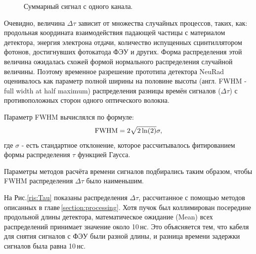 \begin{figure}[h]
	\caption{Суммарный сигнал с одного канала.}
	\label{ris:integralform}
\end{figure}

Очевидно, величина $\Delta\tau$ зависит от множества случайных процессов, таких, как: продольная координата взаимодействия падающей частицы с материалом детектора, энергия электрона отдачи, количество испущенных сцинтиллятором фотонов, достигнувших фотокатода ФЭУ и других. Форма распределения этой величина ожидалась схожей формой нормального распределения случайной величины. Поэтому временное разрешение прототипа детектора NeuRad оценивалось как параметр полной ширины на половине высоты (англ. FWHM - full width at half maximum) распределения разницы времён сигналов ($\Delta\tau$) с противоположных сторон одного оптического волокна.

Параметр FWHM вычислялся по формуле:
\begin{equation}
\label{FWHM}
{\rm FWHM}=2\sqrt{2\ln(2)}\sigma,
\end{equation}
где $\sigma$ - есть стандартное отклонение, которое рассчитывалось фитированием формы распределения $\tau$ функцией Гаусса\cite{vratislav}. 

Параметры методов расчёта времени сигналов подбирались таким образом, чтобы FWHM распределения $\Delta\tau$ было наименьшим. 

На Рис.\ref{ris:Tau} показаны распределения $\Delta\tau$, рассчитанное с помощью методов описанных в главе\,\ref{section:processing}. Хотя пучок был коллимирован посередине продольной длины детектора, математическое ожидание (Mean) всех распределений принимает значение около 10\,нс. Это объясняется тем, что кабеля для снятия сигналов с ФЭУ были разной длины, и разница времени задержки сигналов была равна 10\,нс. 

